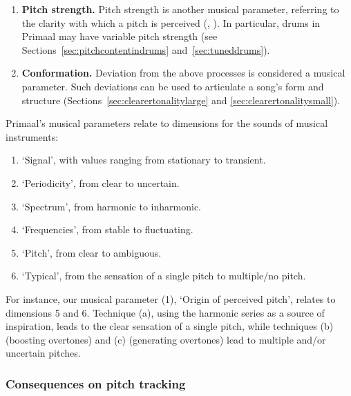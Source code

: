\documentclass{article}
\begin{document}
\begin{enumerate}[label={(\arabic*)}]
    \item {\bfseries Pitch strength.} Pitch strength is another musical parameter, referring to the clarity with which a pitch is perceived (\citealt{zwicker1990pitchstrength}, \citealt[p. 1708]{yost2009pitch}). In particular, drums in Primaal may have variable pitch strength (see Sections~\ref{sec:pitchcontentindrums} and~\ref{sec:tuneddrums}).

    \item {\bfseries Conformation.} Deviation from the above processes is considered a musical parameter. Such deviations can be used to articulate a song's form and structure (Sections~\ref{sec:clearertonalitylarge} and \ref{sec:clearertonalitysmall}). 

\end{enumerate}



Primaal's musical parameters relate to  dimensions for the
sounds of musical instruments:


\begin{enumerate}[noitemsep]
    \item `Signal', with values ranging from stationary to transient.
    \item `Periodicity', from clear to uncertain.
    \item `Spectrum', from harmonic to inharmonic.
    \item `Frequencies', from stable to fluctuating.
    \item `Pitch', from clear to ambiguous.
    \item `Typical', from the sensation of a single pitch to multiple/no pitch.
\end{enumerate}

For instance, our musical parameter (1), `Origin of perceived pitch', relates to  dimensions 5 and 6. Technique (a), using the harmonic series as a source of inspiration, leads to the clear sensation of a single pitch, while techniques (b) (boosting overtones) and (c) (generating overtones) lead to multiple and/or uncertain pitches.



\subsubsection{Consequences on pitch tracking} \label{sec:pitchtracking}
\end{document}
